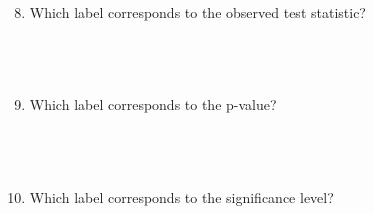\documentclass[12pt]{article}
\begin{document}
\begin{enumerate}[leftmargin=\labelsep]
\setcounter{enumi}{7}

\item Which label corresponds to the observed test statistic?\\
\vspace*{.5cm}\\
\hspace*{1cm}{\bf (a) \hfill (b) \hfill (c) \hfill (d)}\hspace*{1cm}\\
\vspace*{.5cm}\\

\item Which label corresponds to the p-value?\\
\vspace*{.5cm}\\
\hspace*{1cm}{\bf (a) \hfill (b) \hfill (c) \hfill (d)}\hspace*{1cm}\\
\vspace*{.5cm}\\

\item Which label corresponds to the significance level?\\
\vspace*{.5cm}\\
\hspace*{1cm}{\bf (a) \hfill (b) \hfill (c) \hfill (d)}\hspace*{1cm}\\
\vspace*{.5cm}\\
\end{enumerate}
\end{document}
